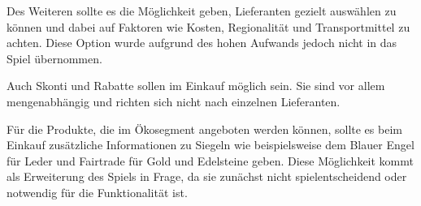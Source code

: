 Des Weiteren sollte es die Möglichkeit geben, Lieferanten gezielt auswählen zu können und dabei auf Faktoren wie Kosten, Regionalität und Transportmittel zu achten.
Diese Option wurde aufgrund des hohen Aufwands jedoch nicht in das Spiel übernommen.

Auch Skonti und Rabatte sollen im Einkauf möglich sein. Sie sind vor allem mengenabhängig und richten sich nicht nach einzelnen Lieferanten.

Für die Produkte, die im Ökosegment angeboten werden können, sollte es beim Einkauf zusätzliche Informationen zu Siegeln wie beispielsweise dem Blauer Engel für Leder und Fairtrade für Gold und Edelsteine geben.
Diese Möglichkeit kommt als Erweiterung des Spiels in Frage, da sie zunächst nicht spielentscheidend oder notwendig für die Funktionalität ist.

